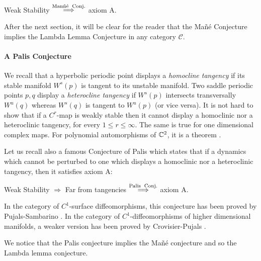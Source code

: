 \documentclass[11pt,openany,leqno]{article}
\begin{document}
\begin{center}
Weak Stability $\overset{\text{Man\~n\'e\; Conj.}}{\Longrightarrow}$ axiom A. 
\end{center}


 

After the next section, it will be clear for the reader that the Ma\~n\'e Conjecture implies the Lambda Lemma Conjecture in any category $\mathcal C$. 



\paragraph{A Palis Conjecture}
We recall that a hyperbolic periodic point displays a \emph{homocline tangency} if its stable manifold $W^s(p)$ is tangent to its unstable manifold. Two saddle periodic points $p,q$ display a \emph{heterocline tangency} if $W^s(p)$ intersects transversally $W^u(q)$ whereas $W^s(q)$ is tangent to $W^u(p)$ (or vice versa). It is not hard to show that if a $C^r$-map is weakly stable then it cannot display a homoclinic nor a heteroclinic tangency, for every $1\le r\le \infty$. The same is true for one dimensional complex maps. For polynomial automorphisms of $\mathbb C^2$, it is a theorem  \cite{Bu97}.



Let us recall also a famous Conjecture of Palis \cite{Pa00} which states that if a dynamics which cannot be perturbed to one which displays a homoclinic nor a heteroclinic tangency, then it satisfies axiom A:
\begin{center}
Weak Stability $\Rightarrow $ Far from tangencies $\overset{\text{Palis\; Conj.}}{\Longrightarrow}$ axiom A. 
\end{center}
In the category of $C^1$-surface diffeomorphisms, this conjecture has been proved by Pujals-Sambarino \cite{PS00}. In the category of $C^1$-diffeomorphisms of higher dimensional manifolds, a weaker version has been proved by Crovisier-Pujals \cite{CP15}.
 
We notice that the Palis conjecture implies the Ma\~n\'e conjecture and so the Lambda lemma conjecture.
 
\end{document}
